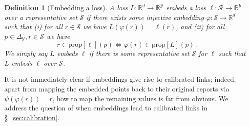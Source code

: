 \documentclass[12pt]{article}
\newcommand{\Comments}{1}
\newcommand{\mynote}[2]{\ifnum\Comments=1\textcolor{#1}{#2}\fi}
\newcommand{\bo}[1]{\mynote{blue}{[Bo: #1]}}
\newcommand{\reals}{\mathbb{R}}
\newcommand{\prop}[1]{\mathrm{prop}[#1]}
\newcommand{\simplex}{\Delta_\Y}
\newcommand{\R}{\mathcal{R}}
\newcommand{\Sc}{\mathcal{S}}
\newcommand{\Y}{\mathcal{Y}}
\newcommand{\inprod}[2]{\langle #1, #2 \rangle}%
\DeclareMathOperator*{\argmin}{arg\,min}
\newtheorem{definition}{Definition}
\begin{document}
\begin{definition}[Embedding a loss]\label{def:loss-embed}
  A loss $L:\reals^d\to\reals^\Y$ \emph{embeds} a loss $\ell:\R\to\reals^\Y$ over a representative set $\Sc$ if there exists some injective embedding $\varphi:\Sc\to\reals^d$ such that
  (i) for all $r\in\Sc$ we have $L(\varphi(r)) = \ell(r)$, and (ii) for all $p\in\simplex,r\in\Sc$ we have
  \begin{equation}\label{eq:embed-loss}
    r \in \prop{\ell}(p) \iff \varphi(r) \in \prop{L}(p)~.
  \end{equation}
  We simply say $L$ \emph{embeds} $\ell$ if there is some representative set $\Sc$ for $\ell$ such that $L$ embeds $\ell$ over $\Sc$.
\end{definition}

%

It is not immediately clear if embeddings give rise to calibrated links; indeed, apart from mapping the embedded points back to their original reports via $\psi(\varphi(r)) = r$, how to map the remaining values is far from obvious.
We address the question of when embeddings lead to calibrated links in \S~\ref{sec:calibration}.
\end{document}
